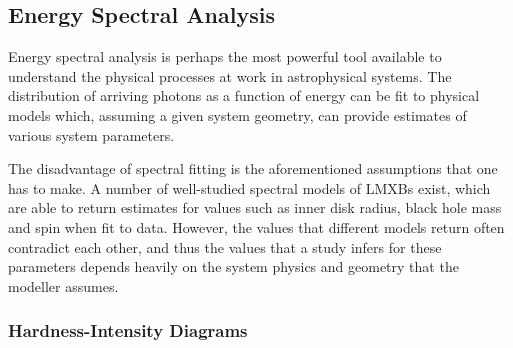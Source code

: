 \subsection{Energy Spectral Analysis}

\par Energy spectral analysis is perhaps the most powerful tool available to understand the physical processes at work in astrophysical systems.  The distribution of arriving photons as a function of energy can be fit to physical models which, assuming a given system geometry, can provide estimates of various system parameters.
\par The disadvantage of spectral fitting is the aforementioned assumptions that one has to make.  A number of well-studied spectral models of LMXBs exist, which are able to return estimates for values such as inner disk radius, black hole mass and spin when fit to data.  However, the values that different models return often contradict each other, and thus the values that a study infers for these parameters depends heavily on the system physics and geometry that the modeller assumes.

\subsubsection{Hardness-Intensity Diagrams}

\label{sec:hids}

